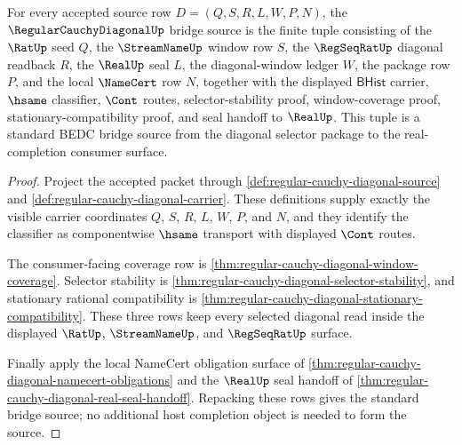 \begin{theorem}
\label{thm:regular-cauchy-diagonal-standard-bridge-source}
For every accepted source row $D=(Q,S,R,L,W,P,N)$, the $\RegularCauchyDiagonalUp$ bridge source is the finite tuple consisting of the $\RatUp$ seed $Q$, the $\StreamNameUp$ window row $S$, the $\RegSeqRatUp$ diagonal readback $R$, the $\RealUp$ seal $L$, the diagonal-window ledger $W$, the package row $P$, and the local $\NameCert$ row $N$, together with the displayed $\mathsf{BHist}$ carrier, $\hsame$ classifier, $\Cont$ routes, selector-stability proof, window-coverage proof, stationary-compatibility proof, and seal handoff to $\RealUp$. This tuple is a standard BEDC bridge source from the diagonal selector package to the real-completion consumer surface.
\end{theorem}
\begin{proof}
Project the accepted packet through \autoref{def:regular-cauchy-diagonal-source} and \autoref{def:regular-cauchy-diagonal-carrier}. These definitions supply exactly the visible carrier coordinates $Q$, $S$, $R$, $L$, $W$, $P$, and $N$, and they identify the classifier as componentwise $\hsame$ transport with displayed $\Cont$ routes.

The consumer-facing coverage row is \autoref{thm:regular-cauchy-diagonal-window-coverage}. Selector stability is \autoref{thm:regular-cauchy-diagonal-selector-stability}, and stationary rational compatibility is \autoref{thm:regular-cauchy-diagonal-stationary-compatibility}. These three rows keep every selected diagonal read inside the displayed $\RatUp$, $\StreamNameUp$, and $\RegSeqRatUp$ surface.

Finally apply the local NameCert obligation surface of \autoref{thm:regular-cauchy-diagonal-namecert-obligations} and the $\RealUp$ seal handoff of \autoref{thm:regular-cauchy-diagonal-real-seal-handoff}. Repacking these rows gives the standard bridge source; no additional host completion object is needed to form the source.
\end{proof}

